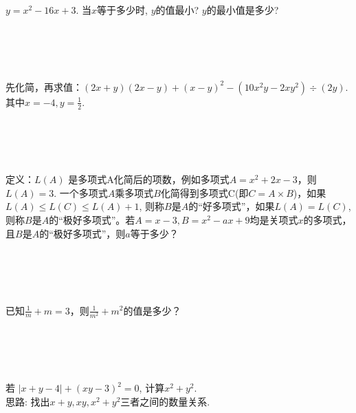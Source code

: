 \item {
    $y=x^2 - 16x + 3$. 当$x$等于多少时, $y$的值最小? $y$的最小值是多少? 
    \ifshowSolution
        \fangsong{}
        \\
    \else
        \\ \\ \\ \\ 
    \fi
}

\item {
    先化简，再求值：$(2x+y)(2x-y) + (x-y)^2 - (10x^2y - 2xy^2)\div (2y)$. 其中$x=-4, y=\frac12$.
    \ifshowSolution
        \fangsong{}
        \\
    \else
        \\ \\ \\ \\ 
    \fi
}

\item {
    定义：$L(A)$ 是多项式A化简后的项数，例如多项式$A=x^2+2x-3$，则$L(A)=3$. 一个多项式$A$乘多项式$B$化简得到多项式C(即$C=A\times B$)，如果$L(A)\leq L(C)\leq L(A)+1$, 则称$B$是$A$的``好多项式''，如果$L(A)=L(C)$, 则称$B$是$A$的``极好多项式''。若$A=x-3, B=x^2-ax+9$均是关项式$x$的多项式，且$B$是$A$的“极好多项式”，则$a$等于多少？
    \ifshowSolution
        \fangsong{}
        \\
    \else
        \\ \\ \\ \\ 
    \fi
}

\item {
    已知$\frac1m + m = 3$，则$\frac{1}{m^2} + m^2$的值是多少？
    \ifshowSolution
        \fangsong{}
        \\
    \else
        \\ \\ \\ \\ 
    \fi
}

\item {
    若 $\lvert x+y-4 \rvert + (xy-3)^2 = 0$, 计算$x^2 + y^2$. 
    \ifshowSolution
        \fangsong{}
        \\
        思路: 找出$x+y, xy, x^2+y^2$三者之间的数量关系. 
    \else
        \\ \\ \\
    \fi
}

